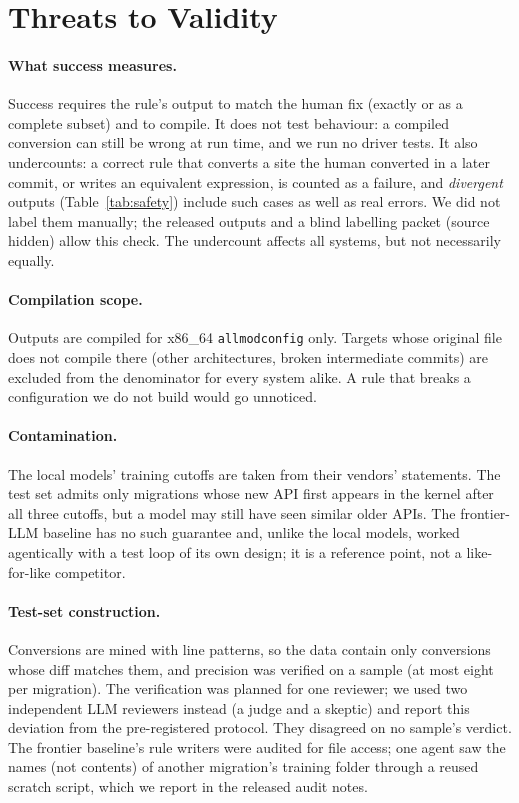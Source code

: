 \section{Threats to Validity}
\label{sec:threats}

\paragraph{What success measures.} Success requires the rule's output to match the human fix (exactly or as a
complete subset) and to compile. It does not test behaviour: a compiled conversion can still be wrong at run time,
and we run no driver tests. It also undercounts: a correct rule that converts a site the human converted in a later
commit, or writes an equivalent expression, is counted as a failure, and \emph{divergent} outputs
(Table~\ref{tab:safety}) include such cases as well as real errors. We did not label them manually; the released
outputs and a blind labelling packet (source hidden) allow this check. The undercount affects all systems, but not
necessarily equally.

\paragraph{Compilation scope.} Outputs are compiled for x86\_64 \texttt{allmodconfig} only. Targets whose original
file does not compile there (other architectures, broken intermediate commits) are excluded from the denominator
for every system alike. A rule that breaks a configuration we do not build would go unnoticed.

\paragraph{Contamination.} The local models' training cutoffs are taken from their vendors' statements. The test
set admits only migrations whose new API first appears in the kernel after all three cutoffs, but a model may still
have seen similar older APIs. The frontier-LLM baseline has no such guarantee and, unlike the local models, worked
agentically with a test loop of its own design; it is a reference point, not a like-for-like competitor.

\paragraph{Test-set construction.} Conversions are mined with line patterns, so the data contain only conversions
whose diff matches them, and precision was verified on a sample (at most eight per migration). The verification
was planned for one reviewer; we used two independent LLM reviewers instead (a judge and a skeptic) and report this
deviation from the pre-registered protocol. They disagreed on no sample's verdict. The frontier baseline's rule
writers were audited for file access; one agent saw the names (not contents) of another migration's training
folder through a reused scratch script, which we report in the released audit notes.

